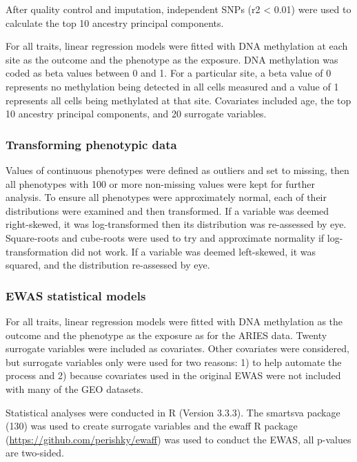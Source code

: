 \documentclass[11pt,oneside]{bristolthesis}
\begin{document}
After quality control and imputation, independent SNPs (r2 \textless{} 0.01) were used to calculate the top 10 ancestry principal components.

For all traits, linear regression models were fitted with DNA methylation at each site as the outcome and the phenotype as the exposure. DNA methylation was coded as beta values between 0 and 1. For a particular site, a beta value of 0 represents no methylation being detected in all cells measured and a value of 1 represents all cells being methylated at that site. Covariates included age, the top 10 ancestry principal components, and 20 surrogate variables.

\hypertarget{transforming-phenotypic-data}{%
\subsubsection{Transforming phenotypic data}\label{transforming-phenotypic-data}}

Values of continuous phenotypes were defined as outliers and set to missing, then all phenotypes with 100 or more non-missing values were kept for further analysis. To ensure all phenotypes were approximately normal, each of their distributions were examined and then transformed. If a variable was deemed right-skewed, it was log-transformed then its distribution was re-assessed by eye. Square-roots and cube-roots were used to try and approximate normality if log-transformation did not work. If a variable was deemed left-skewed, it was squared, and the distribution re-assessed by eye.

\hypertarget{ewas-statistical-models}{%
\subsubsection{EWAS statistical models}\label{ewas-statistical-models}}

For all traits, linear regression models were fitted with DNA methylation as the outcome and the phenotype as the exposure as for the ARIES data. Twenty surrogate variables were included as covariates. Other covariates were considered, but surrogate variables only were used for two reasons: 1) to help automate the process and 2) because covariates used in the original EWAS were not included with many of the GEO datasets.

Statistical analyses were conducted in R (Version 3.3.3). The smartsva package (130) was used to create surrogate variables and the ewaff R package (\url{https://github.com/perishky/ewaff}) was used to conduct the EWAS, all p-values are two-sided.
\end{document}
